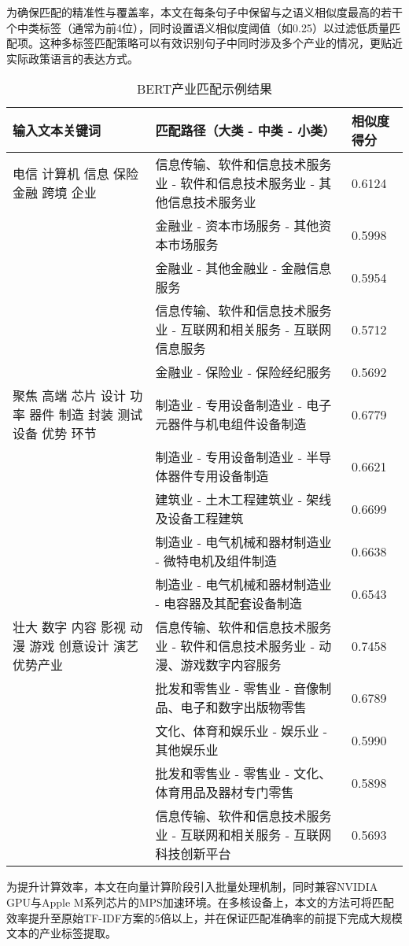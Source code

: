 \documentclass[a4paper,11pt, fontset=fandol]{ctexart}
\begin{document}
为确保匹配的精准性与覆盖率，本文在每条句子中保留与之语义相似度最高的若干个中类标签（通常为前4位），同时设置语义相似度阈值（如0.25）以过滤低质量匹配项。这种多标签匹配策略可以有效识别句子中同时涉及多个产业的情况，更贴近实际政策语言的表达方式。
\footnotesize
\begin{table}[H]
    \centering
    \caption{BERT产业匹配示例结果}
    \label{tab:bert_match_examples}
    \begin{tabular}{p{3cm} p{9cm} p{2.5cm}}
    \toprule
    \textbf{输入文本关键词} & \textbf{匹配路径（大类 - 中类 - 小类）} & \textbf{相似度得分} \\
    \midrule
    电信 计算机 信息 保险 金融 跨境 企业 & 信息传输、软件和信息技术服务业 - 软件和信息技术服务业 - 其他信息技术服务业 & 0.6124 \\
    & 金融业 - 资本市场服务 - 其他资本市场服务 & 0.5998 \\
    & 金融业 - 其他金融业 - 金融信息服务 & 0.5954 \\
    & 信息传输、软件和信息技术服务业 - 互联网和相关服务 - 互联网信息服务 & 0.5712 \\
    & 金融业 - 保险业 - 保险经纪服务 & 0.5692 \\
    \midrule
    聚焦 高端 芯片 设计 功率 器件 制造 封装 测试 设备 优势 环节 & 制造业 - 专用设备制造业 - 电子元器件与机电组件设备制造 & 0.6779 \\
    & 制造业 - 专用设备制造业 - 半导体器件专用设备制造 & 0.6621 \\
    & 建筑业 - 土木工程建筑业 - 架线及设备工程建筑 & 0.6699 \\
    & 制造业 - 电气机械和器材制造业 - 微特电机及组件制造 & 0.6638 \\
    & 制造业 - 电气机械和器材制造业 - 电容器及其配套设备制造 & 0.6543 \\
    \midrule
    壮大 数字 内容 影视 动漫 游戏 创意设计 演艺 优势产业& 信息传输、软件和信息技术服务业 - 软件和信息技术服务业 - 动漫、游戏数字内容服务 & 0.7458 \\
     & 批发和零售业 - 零售业 - 音像制品、电子和数字出版物零售 & 0.6789 \\
    & 文化、体育和娱乐业 - 娱乐业 - 其他娱乐业 & 0.5990 \\
    & 批发和零售业 - 零售业 - 文化、体育用品及器材专门零售 & 0.5898 \\
    & 信息传输、软件和信息技术服务业 - 互联网和相关服务 - 互联网科技创新平台 & 0.5693 \\
    \bottomrule
    \end{tabular}
    \end{table}
\normalsize
为提升计算效率，本文在向量计算阶段引入批量处理机制，同时兼容NVIDIA GPU与Apple M系列芯片的MPS加速环境。在多核设备上，本文的方法可将匹配效率提升至原始TF-IDF方案的5倍以上，并在保证匹配准确率的前提下完成大规模文本的产业标签提取。
\end{document}
